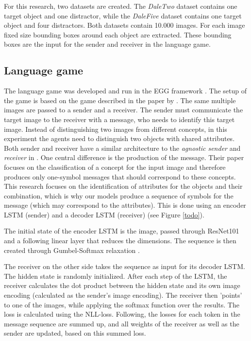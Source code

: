 \documentclass[11pt]{article}
\begin{document}
For this research, two datasets are created. The \emph{DaleTwo} dataset contains one target object and one distractor, while the \emph{DaleFive} dataset contains one target object and four distractors. Both datasets contain 10.000 images. For each image fixed size bounding boxes around each object are extracted. These bounding boxes are the input for the sender and receiver in the language game.

\subsection{Language game}
The language game was developed and run in the EGG framework \citep{Kharitonov2019}. The setup of the game is based on the game described in the paper by \citet{Lazaridou2016}. The same multiple images are passed to a sender and a receiver. The sender must communicate the target image to the receiver with a message, who needs to identify this target image. Instead of distinguishing two images from different concepts, in this experiment the agents need to distinguish two objects with shared attributes. Both sender and receiver have a similar architecture to the \emph{agnostic sender} and \emph{receiver} in \citet{Lazaridou2016}. One central difference is the production of the message. Their paper focuses on the classification of a concept for the input image and therefore produces only one-symbol messages that should correspond to these concepts. This research focuses on the identification of attributes for the objects and their combination, which is why our models produce a sequence of symbols for the message (which may correspond to the attributes). This is done using an encoder LSTM (sender) and a decoder LSTM (receiver) (see Figure \ref*{todo}).

The initial state of the encoder LSTM is the image, passed through ResNet101 and a following linear layer that reduces the dimensions. The sequence is then created through Gumbel-Softmax relaxation \citep{Jang2016}.

The receiver on the other side takes the sequence as input for its decoder LSTM. The hidden state is randomly initialized. After each step of the LSTM, the receiver calculates the dot product between the hidden state and its own image encoding (calculated as the sender's image encoding). The receiver then 'points' to one of the images, while applying the softmax function over the results. The loss is calculated using the NLL-loss. Following, the losses for each token in the message sequence are summed up, and all weights of the receiver as well as the sender are updated, based on this summed loss.
\end{document}
